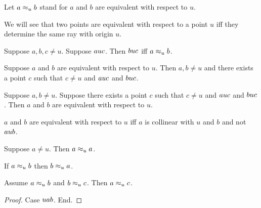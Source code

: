 \documentclass[10pt,a4paper,parskip=half,numbers=endperiod,parskip]{scrartcl}
\begin{document}
  \begin{convention}
    \begin{forthel}
      Let $\RelEquiv{a}{b}{u}$ stand for $a$ and $b$ are equivalent with respect to $u$.
    \end{forthel}
  \end{convention}

  We will see that two points are equivalent with respect to a point $u$
  iff they determine the same ray with origin $u$.

  \begin{forthel}
    \begin{lemma} %
      Suppose $a,b,c \neq u$.
      Suppose $\Betw{a}{u}{c}$.
      Then $\Betw{b}{u}{c}$ iff
        $\RelEquiv{a}{b}{u}$.
    \end{lemma}

    \begin{lemma} %
      Suppose $a$ and $b$ are equivalent with respect to $u$.
      Then $a, b\neq u$ and there exists a point $c$ such that
        $c\neq u$ and $\Betw{a}{u}{c}$ and $\Betw{b}{u}{c}$.
    \end{lemma}

    \begin{lemma} %
      Suppose $a, b\neq u$.
      Suppose there exists a point $c$ such that
        $c\neq u$ and $\Betw{a}{u}{c}$ and $\Betw{b}{u}{c}$.
      Then $a$ and $b$ are equivalent with respect to $u$.
    \end{lemma}

    \begin{lemma} %
      $a$ and $b$ are equivalent with respect to $u$ iff
        $a$ is collinear with $u$ and $b$ and not $\Betw{a}{u}{b}$.
    \end{lemma}

    \begin{lemma}
      Suppose $a\neq u$.
      Then $\RelEquiv{a}{a}{u}$.
    \end{lemma}

    \begin{lemma}
      If $\RelEquiv{a}{b}{u}$ then $\RelEquiv{b}{a}{u}$.
    \end{lemma}

    \begin{lemma}
      Assume $\RelEquiv{a}{b}{u}$ and $\RelEquiv{b}{c}{u}$.
      Then $\RelEquiv{a}{c}{u}$.
    \end{lemma}
    \begin{proof} %
      Case $\Betw{u}{a}{b}$.
      End.
    \end{proof}
  \end{forthel}
\end{document}
